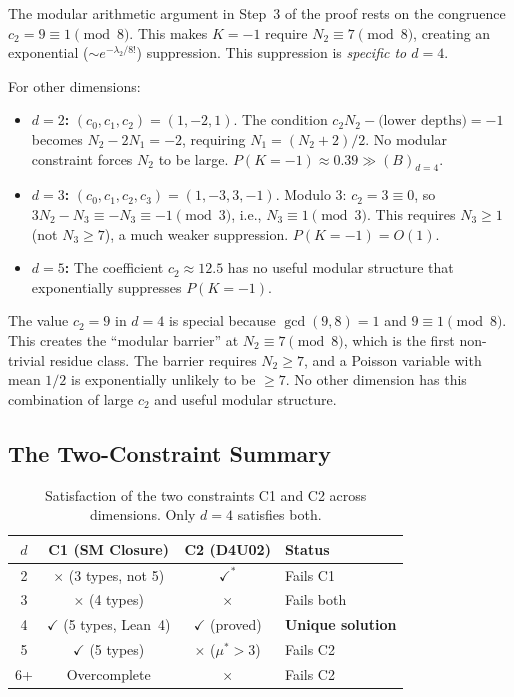\documentclass[12pt,a4paper]{article}
\begin{document}
The modular arithmetic argument in Step~3 of the proof rests on the congruence $c_2=9\equiv1\pmod8$.  This makes $K=-1$ require $N_2\equiv7\pmod8$, creating an exponential ($\sim e^{-\lambda_2/8!}$) suppression.  This suppression is \emph{specific to $d=4$}.

For other dimensions:
\begin{itemize}
  \item \textbf{$d=2$:} $(c_0,c_1,c_2)=(1,-2,1)$.  The condition $c_2 N_2-\text{(lower depths)}=-1$ becomes $N_2-2N_1=-2$, requiring $N_1=(N_2+2)/2$.  No modular constraint forces $N_2$ to be large.  $P(K=-1)\approx0.39\gg(B)_{d=4}$.
  \item \textbf{$d=3$:} $(c_0,c_1,c_2,c_3)=(1,-3,3,-1)$.  Modulo 3: $c_2=3\equiv0$, so $3N_2-N_3\equiv -N_3\equiv-1\pmod3$, i.e., $N_3\equiv1\pmod3$.  This requires $N_3\geq1$ (not $N_3\geq7$), a much weaker suppression.  $P(K=-1)=O(1)$.
  \item \textbf{$d=5$:} The coefficient $c_2\approx12.5$ has no useful modular structure that exponentially suppresses $P(K=-1)$.
\end{itemize}

The value $c_2=9$ in $d=4$ is special because $\gcd(9,8)=1$ and $9\equiv1\pmod8$.  This creates the ``modular barrier'' at $N_2\equiv7\pmod8$, which is the first non-trivial residue class.  The barrier requires $N_2\geq7$, and a Poisson variable with mean $1/2$ is exponentially unlikely to be $\geq7$.  No other dimension has this combination of large $c_2$ and useful modular structure.

\subsection{The Two-Constraint Summary}

\begin{table}[ht]
\centering
\caption{Satisfaction of the two constraints C1 and C2 across dimensions.  Only $d=4$ satisfies both.}
\label{tab:d4_summary}
\begin{tabular}{cccl}
\toprule
$d$ & C1 (SM Closure) & C2 (D4U02) & Status \\
\midrule
2 & $\times$ (3 types, not 5) & $\checkmark^*$ & Fails C1 \\
3 & $\times$ (4 types) & $\times$ & Fails both \\
4 & $\checkmark$ (5 types, Lean~4) & $\checkmark$ (proved) & \textbf{Unique solution} \\
5 & $\checkmark$ (5 types) & $\times$ ($\mu^*>3$) & Fails C2 \\
6+ & Overcomplete & $\times$ & Fails C2 \\
\bottomrule
\end{tabular}
\end{table}
\end{document}
